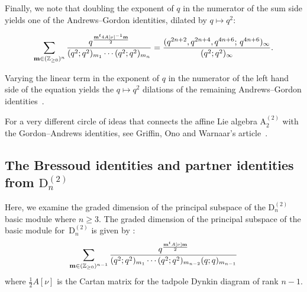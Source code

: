 \documentclass[ALCO,Unicode,published]{cedram}
\begin{document}
Finally, we note that doubling the exponent of $q$ in the numerator of the sum side  yields one of the Andrews--Gordon identities, dilated by $q \mapsto q^2$:
\begin{thm} 
\begin{equation}
\sum_{{\bf m} \in (\mathbb{Z}_{\ge 0})^{n}}\frac{q^{\frac{{\bf m}^t 4A[\nu]^{-1}{\bf m}}{2}}}{{(q^2};q^2)_{m_1}\cdots (q^2;q^2)_{m_{n}}} = 
\dfrac{(q^{2n+2},q^{2n+4},q^{4n+6};\,q^{4n+6})_\infty}{(q^2;q^2)_\infty}.
\end{equation}
\end{thm}
Varying the linear term in the exponent of $q$ in the numerator of the left hand side of the equation yields the $q\mapsto q^2$ dilations of the remaining Andrews--Gordon identities~\cite{A}.

For a very different circle of ideas that connects the affine Lie algebra
$\mathrm{A}_2^{(2)}$ with the Gordon--Andrews identities, see 
Griffin, Ono and Warnaar's article~\cite{GriOnoWar}.


\subsection{The Bressoud identities and partner identities from \texorpdfstring{$\mathrm{D}_n^{(2)}$}{Dn(2)}}
Here, we examine the graded dimension of the principal subspace of the $\mathrm D_{n}^{(2)}$ basic module where $n \ge 3$. 
The graded dimension of the principal subspace of the basic module for~$\mathrm D_n^{(2)}$ is given by \cite{PS2}:
\begin{equation}
\sum_{{\bf m} \in (\mathbb{Z}_{\ge 0})^{n-1}}\frac{q^{\frac{{\bf m}^t A[\nu] {\bf m}}{2}}}{{(q^2};q^2)_{m_1}\cdots (q^{2};q^{2})_{m_{n-2}}(q;q)_{m_{n-1}}}
\end{equation}
where $\frac{1}{2}A[\nu]$ is the Cartan matrix for the tadpole Dynkin diagram of rank $n-1$.
\end{document}
